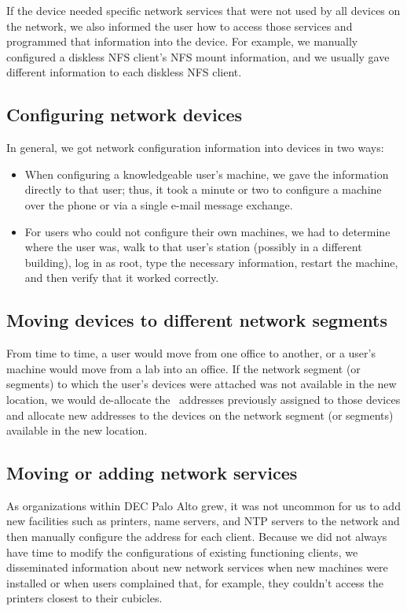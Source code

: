 If the device needed specific network services that were not used by all devices on the network, we also informed the user how to access those services and programmed that information into the device.
For example, we manually configured a diskless \acf{NFS} client's \acs{NFS} mount information, and we usually gave different information to each diskless \acs{NFS} client.

\subsection{Configuring network devices}
In general, we got network configuration information into devices in two ways:
\begin{itemize}
\item
   When configuring a knowledgeable user's machine, we gave the information directly to that user; thus, it took a minute or two to configure a machine over the phone or via a single e-mail message exchange.
\item
   For users who could not configure their own machines, we had to determine where the user was, walk to that user's station (possibly in a different building), log in as root, type the necessary information, restart the machine, and then verify that it worked correctly.
\end{itemize}

\subsection{Moving devices to different network segments}
From time to time, a user would move from one office to another, or a user's machine would move from a lab into an office.
If the network segment (or segments) to which the user's devices were attached was not available in the new location, we would de-allocate the \IP\ addresses previously assigned to those devices and allocate new addresses to the devices on the network segment (or segments) available in the new location.

\subsection{Moving or adding network services}
As organizations within \acs{DEC} Palo Alto grew, it was not uncommon for us to add new facilities such as printers, name servers, and \acf{NTP} servers to the network and then manually configure the address for each client.
Because we did not always have time to modify the configurations of existing functioning clients, we disseminated information about new network services when new machines were installed or when users complained that, for example, they couldn't access the printers closest to their cubicles.

